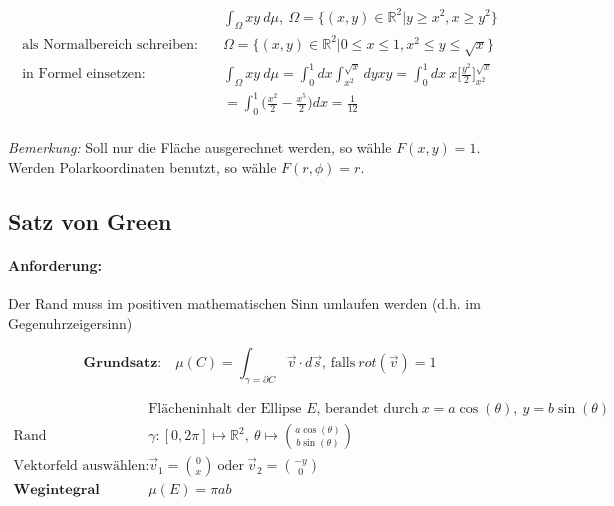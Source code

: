 \documentclass[11pt]{article}
\begin{document}
\begin{equation*}
\begin{split}
	& \int_\Omega xy\ d\mu,\ \Omega = \{(x,y) \in \mathbb{R}^2| y \geq x^2, x \geq y^2 \} \\
	\text{als Normalbereich schreiben:}\quad & \Omega = \{(x,y) \in \mathbb{R}^2| 0 \leq x \leq 1, x^2 \leq y \leq \sqrt{x}\} \\
	\text{in Formel einsetzen:}\quad & \int_\Omega xy\ d\mu = \int_0^1 dx\int_{x^2}^{\sqrt{x}} dyxy = \int_0^1 dx\ x \Big[\frac{y^2}{2}\Big]_{x^2}^{\sqrt{x}} \\
	& = \int_0^1 \Big(\frac{x^2}{2}-\frac{x^5}{2}\Big)dx = \frac{1}{12} \\
\end{split}
\end{equation*}

\emph{Bemerkung:} Soll nur die Fl{\"a}che ausgerechnet werden, so w{\"a}hle $F(x,y) = 1$. Werden Polarkoordinaten benutzt, so w{\"a}hle $F(r, \phi) = r$.

\subsection{Satz von Green}

\paragraph{Anforderung:} Der Rand muss im positiven mathematischen Sinn umlaufen werden (d.h. im Gegenuhrzeigersinn)

\begin{equation*}
	\textbf{Grundsatz:}\quad \mu(C) = \int_{\gamma = \partial C} \vec{v} \cdot d\vec{s}\text{, falls}\ rot(\vec{v}) = 1
\end{equation*}

\begin{equation*}
\begin{split}
	& \text{Fl{\"a}cheninhalt der Ellipse $E$, berandet durch}\ x = a\cos(\theta),\ y = b\sin(\theta) \\
	\text{Rand parametrisieren:}\quad & \gamma: [0, 2\pi] \mapsto \mathbb{R}^2,\ \theta \mapsto \binom{a\cos(\theta)}{b\sin(\theta)} \\
	\text{Vektorfeld ausw{\"a}hlen:}\quad & \vec{v}_1 = \binom{0}{x}\ \text{oder}\ \vec{v}_2 = \binom{-y}{0} \\
	\textbf{Wegintegral ausrechnen:}\quad & \mu(E) = \pi ab
\end{split}
\end{equation*}
\end{document}
